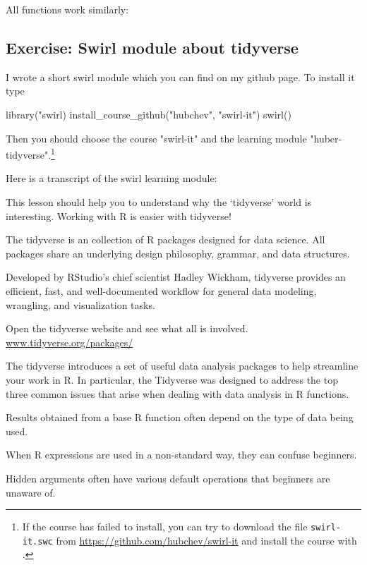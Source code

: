 All functions work similarly:


\subsection*{Exercise: Swirl module about tidyverse}
I wrote a short swirl module which you can find on my github page. To install it type 
\begin{rblock1}
	library("swirl)
	install_course_github("hubchev", "swirl-it")
	swirl()
\end{rblock1}
Then you should choose the course "swirl-it" and the learning module "huber-tidyverse".\footnote{If the course has failed to install, you can try to download the file \texttt{swirl-it.swc} from \url{https://github.com/hubchev/swirl-it} and install the course with .}

Here is a transcript of the swirl learning module:

This lesson should help you to understand why the ‘tidyverse’ world is interesting. Working with R is easier with tidyverse!

The tidyverse is an collection of R packages designed for data science. All packages share an underlying design philosophy, grammar, and data structures.

Developed by RStudio's chief scientist Hadley Wickham, tidyverse provides an efficient, fast, and well-documented workflow for general data modeling, wrangling, and visualization tasks.

Open the tidyverse website and see what all is involved. \url{www.tidyverse.org/packages/}

The tidyverse introduces a set of useful data analysis packages to help streamline your work in R. In particular, the Tidyverse was designed to address the top three common issues that arise when dealing with data analysis in R functions.

Results obtained from a base R function often depend on the type of data being used.

When R expressions are used in a non-standard way, they can confuse beginners.

Hidden arguments often have various default operations that beginners are unaware of.

